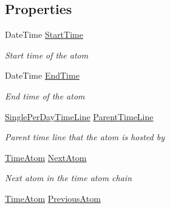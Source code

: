 \subsection*{Properties}
\begin{DoxyCompactItemize}
\item 
Date\+Time \hyperlink{class_general_health_care_elements_1_1_booking_models_1_1_time_atom_ad6e422ef0c2cb03cf1dec9861a40f544}{Start\+Time}
\begin{DoxyCompactList}\small\item\em Start time of the atom \end{DoxyCompactList}\item 
Date\+Time \hyperlink{class_general_health_care_elements_1_1_booking_models_1_1_time_atom_ad6854233f39a11d2058392c6dbfb39de}{End\+Time}
\begin{DoxyCompactList}\small\item\em End time of the atom \end{DoxyCompactList}\item 
\hyperlink{class_general_health_care_elements_1_1_booking_models_1_1_single_per_day_time_line}{Single\+Per\+Day\+Time\+Line} \hyperlink{class_general_health_care_elements_1_1_booking_models_1_1_time_atom_a2df3bde1d3b9e83799262667b33145d1}{Parent\+Time\+Line}
\begin{DoxyCompactList}\small\item\em Parent time line that the atom is hosted by \end{DoxyCompactList}\item 
\hyperlink{class_general_health_care_elements_1_1_booking_models_1_1_time_atom}{Time\+Atom} \hyperlink{class_general_health_care_elements_1_1_booking_models_1_1_time_atom_a48057a35cf930bf31fef72d101e019ad}{Next\+Atom}
\begin{DoxyCompactList}\small\item\em Next atom in the time atom chain \end{DoxyCompactList}\item 
\hyperlink{class_general_health_care_elements_1_1_booking_models_1_1_time_atom}{Time\+Atom} \hyperlink{class_general_health_care_elements_1_1_booking_models_1_1_time_atom_a6db649d61f807f5023de827716e9fe61}{Previous\+Atom}

\end{DoxyCompactItemize}
